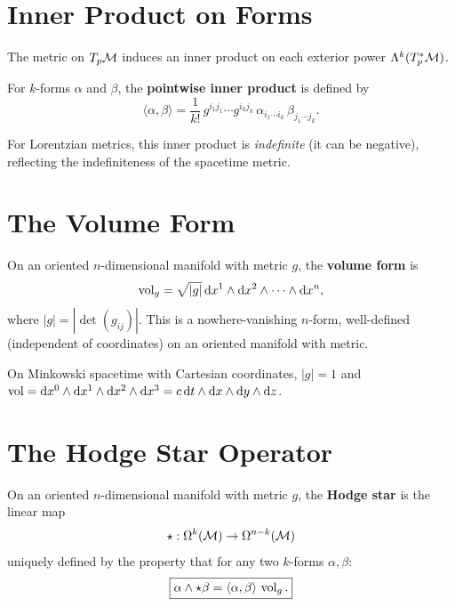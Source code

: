 \section{Inner Product on Forms}

The metric on $T_p\mathcal{M}$ induces an inner product on each exterior power $\Lambda^k(T_p^*\mathcal{M})$.

\begin{definition}
For $k$-forms $\alpha$ and $\beta$, the \textbf{pointwise inner product} is defined by
\begin{equation}
\langle \alpha, \beta \rangle = \frac{1}{k!}\,g^{i_1 j_1}\cdots g^{i_k j_k}\,\alpha_{i_1\cdots i_k}\,\beta_{j_1\cdots j_k}.
\end{equation}
\end{definition}

For Lorentzian metrics, this inner product is \emph{indefinite} (it can be negative), reflecting the indefiniteness of the spacetime metric.

\section{The Volume Form}

\begin{definition}
On an oriented $n$-dimensional manifold with metric $g$, the \textbf{volume form} is
\begin{equation}
\operatorname{vol}_g = \sqrt{|g|}\,\mathrm{d} x^1 \wedge \mathrm{d} x^2 \wedge \cdots \wedge \mathrm{d} x^n,
\end{equation}
where $|g| = |\det(g_{ij})|$. This is a nowhere-vanishing $n$-form, well-defined (independent of coordinates) on an oriented manifold with metric.
\end{definition}

On Minkowski spacetime with Cartesian coordinates, $|g| = 1$ and $\operatorname{vol} = \mathrm{d} x^0 \wedge \mathrm{d} x^1 \wedge \mathrm{d} x^2 \wedge \mathrm{d} x^3 = c\,\mathrm{d} t \wedge \mathrm{d} x \wedge \mathrm{d} y \wedge \mathrm{d} z$.

\section{The Hodge Star Operator}

\begin{definition}
On an oriented $n$-dimensional manifold with metric $g$, the \textbf{Hodge star} is the linear map
\begin{equation}
\star: \Omega^k(\mathcal{M}) \to \Omega^{n-k}(\mathcal{M})
\end{equation}
uniquely defined by the property that for any two $k$-forms $\alpha, \beta$:
\begin{equation}
\boxed{\alpha \wedge \star\beta = \langle\alpha, \beta\rangle\,\operatorname{vol}_g.}
\end{equation}
\end{definition}

